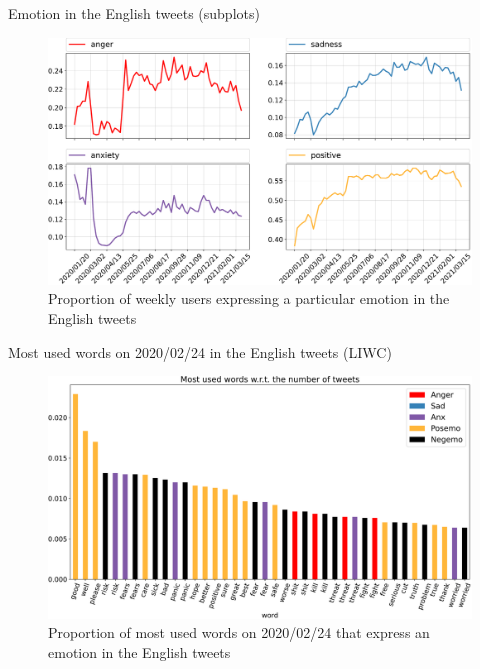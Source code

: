 \documentclass[9pt,aspectratio=1610]{beamer}  %
\begin{document}
\begin{frame}{Emotion in the English tweets (subplots)}

    \begin{figure}[H]
	    \centering
    	\includegraphics[scale=.30]{assets/img/en_4_liwc_categories_subplots.svg.pdf}
    	\caption{Proportion of weekly users expressing a particular emotion in the English tweets}
    	\label{fig:en-4-liwc-categories-subplots}
    \end{figure}

    
\end{frame}

\begin{frame}{Most used words on 2020/02/24 in the English tweets (LIWC)}

    \begin{figure}[H]
	    \centering
    	\includegraphics[scale=.30]{assets/img/en_most_used_liwc_words_2020_02_24.svg.pdf}
    	\caption{Proportion of most used words on 2020/02/24 that express an emotion in the English tweets}
    	\label{fig:en-most-used-liwc-words-2020-02-24}
    \end{figure}
    
\end{frame}
\end{document}
